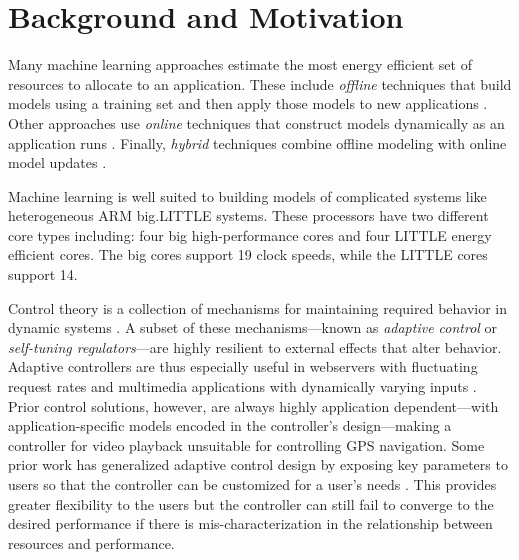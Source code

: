 \section{Background and Motivation}
\label{sec:example}

Many machine learning approaches estimate the most energy efficient
set of resources to allocate to an application.  These include
\emph{offline} techniques that build models using a training set and
then apply those models to new applications
\cite{Yi2003,LeeBrooks2006,CPR,ChenJohn2011,reddiHPCA2013,Paragon,PUPiL}.
Other approaches use \emph{online} techniques that construct models
dynamically as an application runs
\cite{Li2006,Flicker,ParallelismDial,Ponamarev,LeeBrooks}.  Finally,
\emph{hybrid} techniques combine offline modeling with online model
updates \cite{Zhang2012,packandcap,Winter2010,dubach2010,Koala,Cinder,
  wu2012inferred,LEO}.  

Machine learning is well suited to building
models of complicated systems like heterogeneous ARM big.LITTLE
systems.  These processors have two different core types including:
four big high-performance cores and four LITTLE energy efficient
cores.  The big cores support 19 clock speeds, while the LITTLE cores
support 14.

Control theory is a collection of mechanisms for maintaining required
behavior in dynamic systems \cite{Hellerstein2004a}. A subset of these
mechanisms---known as \emph{adaptive control} or \emph{self-tuning
  regulators}---are highly resilient to external effects that alter
behavior.  Adaptive controllers are thus especially useful in
webservers with fluctuating request rates
\cite{Horvarth,LuEtAl-2006a,SunDaiPan-2008a} and multimedia
applications with dynamically varying inputs
\cite{TCST,Agilos,grace2}.  Prior control solutions, however, are
always highly application dependent---with application-specific models
encoded in the controller's design---making a controller for video
playback unsuitable for controlling GPS navigation.  Some prior work
has generalized adaptive control design by exposing key parameters to
users so that the controller can be customized for a user's needs
\cite{ControlWare,POET}.  
This provides greater flexibility to the users but the controller can still fail to converge to the desired performance if there is mis-characterization in the relationship between resources and performance.  

